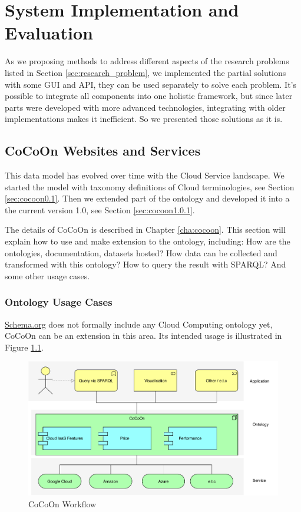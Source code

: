 \chapter{System Implementation and Evaluation}
\label{cha:system}
As we proposing methods to address different aspects of the research problems listed in Section \ref{sec:research_problem}, we implemented the partial solutions with some GUI and API, they can be used separately to solve each problem.
It's possible to integrate all components into one holistic framework, but since later parts were developed with more advanced technologies, integrating with older implementations makes it inefficient. So we presented those solutions as it is.

\section{CoCoOn Websites and Services}
\label{sec:cocoonImplementation}
This data model has evolved over time with the Cloud Service landscape.
We started the model with taxonomy definitions of Cloud terminologies,
see Section \ref{sec:cocoon0.1}.
Then we extended part of the ontology and developed it into
a the current version 1.0, see Section \ref{sec:cocoon1.0.1}.

The details of CoCoOn is described in Chapter \ref{cha:cocoon}. This section will explain how to use and make extension to the ontology, including: How are the ontologies, documentation, datasets hosted? How data can be collected and transformed with this ontology? How to query the result with SPARQL? And some other usage cases.

\subsection{Ontology Usage Cases}
\href{https://schema.org/}{Schema.org} does not formally include any Cloud Computing ontology yet, CoCoOn can be an extension in this area.
Its intended usage is illustrated in Figure \ref{fig:cocoon_workflow}.

\begin{figure}[!ht]
  \includegraphics[width=\textwidth,keepaspectratio]{Figures/system/cocoon_usecase.pdf}
  \caption{CoCoOn Workflow}
  \label{fig:cocoon_workflow}
\end{figure}

